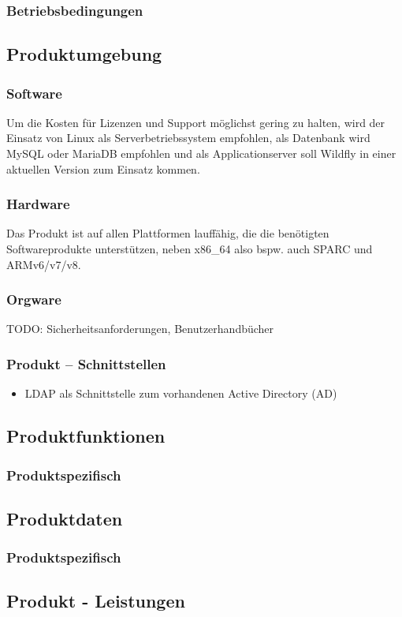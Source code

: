 \documentclass[12pt,a4paper,parskip]{scrreprt}
\begin{document}
\subsubsection{Betriebsbedingungen}
\subsection{Produktumgebung}
\subsubsection{Software}
Um die Kosten für Lizenzen und Support möglichst gering zu halten, wird der Einsatz von Linux als Serverbetriebssystem empfohlen, als Datenbank wird MySQL oder MariaDB empfohlen und als Applicationserver soll Wildfly in einer aktuellen Version zum Einsatz kommen.
\subsubsection{Hardware}
Das Produkt ist auf allen Plattformen lauffähig, die die benötigten Softwareprodukte unterstützen, neben x86\_64 also bspw. auch SPARC und ARMv6/v7/v8.
\subsubsection{Orgware}
TODO: Sicherheitsanforderungen, Benutzerhandbücher
\subsubsection{Produkt – Schnittstellen}
\begin{itemize}
\item LDAP als Schnittstelle zum vorhandenen Active Directory (AD)
\end{itemize}
\subsection{Produktfunktionen}
\subsubsection{Produktspezifisch}
\subsection{Produktdaten}
\subsubsection{Produktspezifisch}
\subsection{Produkt - Leistungen}
\end{document}
